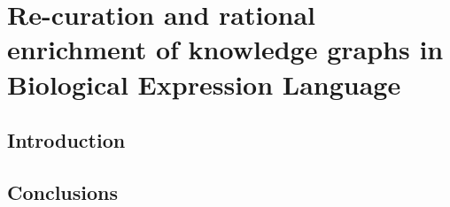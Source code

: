 \chapter{Re-curation and rational enrichment of knowledge graphs in Biological Expression Language}\label{chap:recuration}

\section*{Introduction}

\vspace*{\fill}



\section*{Conclusions}
